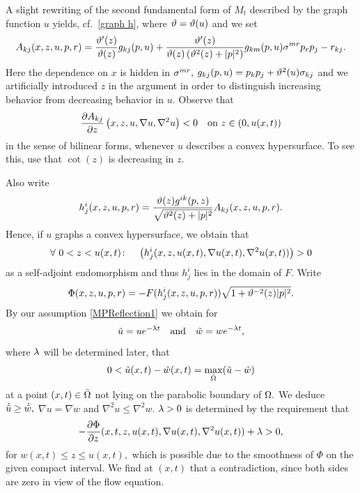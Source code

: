 \documentclass{amsart}
\begin{document}
{A slight rewriting of the second fundamental form of $M_t$ described by the graph function $u$ yields, cf.~\eqref{graph h},
 where $\vt=\vt(u)$ and we set
 $$A_{kj}(x,z,u,p,r)=\fr{\vt'(z)}{\vt(z)}g_{kj}(p,u)+\fr{\vt'(z)}{\vt(z)\br{\vt^2(z)+|p|^2}}g_{km}(p,u)\s^{mr}p_rp_j-r_{kj}.$$
 Here the dependence on $x$ is hidden in $\s^{mr},$ $g_{kj}(p,u)=p_k p_j+\vt^{2}(u)\s_{kj}$ and we artificially introduced $z$ in the argument in order to distinguish increasing behavior from decreasing behavior in $u.$ Observe that
 $$\fr{\del A_{kj}}{\del z}\br{x,z,u,\nabla u,\nabla^2u}<0\quad\text{on}~ z\in(0,u(x,t))$$
 in the sense of bilinear forms, whenever $u$ describes a convex hypersurface. To see this, use that $\cot(z)$ is decreasing in $z.$

Also write
$$h^i_j(x,z,u,p,r)=\fr{\vt(z)g^{ik}(p,z)}{\sqrt{\vt^2(z)+|p|^2}}A_{kj}(x,z,u,p,r).$$
Hence, if $u$ graphs a convex hypersurface, we obtain that
$$\forall~ 0<z< u(x,t)\cn\quad \br{h^i_j(x,z,u(x,t),\nabla u(x,t),\nabla^2u(x,t))}>0$$
as a self-adjoint endomorphism and thus $h^i_j$ lies in the domain of $F.$ Write
  $$\Phi(x,z,u,p,r)=-F(h^i_j(x,z,u,p,r))\sqrt{1+\vt^{-2}(z)|p|^2}.$$
By our assumption \eqref{MPReflection1} we obtain for 
 $$\~u=ue^{-\l t}\quad\text{and}\quad \~w=we^{-\l t},$$
 where $\l$ will be determined later, that
 $$0<\~u(x,t)-\~w(x,t)=\max_{\-\O}(\~u-\~w)$$
 at a point $(x,t)\in\-\O$ not lying on the parabolic boundary of $\O.$ We deduce $\dot{\~u}\geq \dot{\~w},$ $\nabla u=\nabla w$ and $\nabla^2u\leq \nabla^2w.$ 
$\l>0$ is determined by the requirement that
$$-\fr{\del\Phi}{\del z}(x,t,z,u(x,t),\nabla u(x,t),\nabla^2 u(x,t))+\l>0,
$$
for $w(x,t)\leq z\leq u(x,t),$ which is possible due to the smoothness of $\Phi$ on the given compact interval. We find at $(x,t)$ that
 a contradiction, since both sides are zero in view of the flow equation.
}
\end{document}
